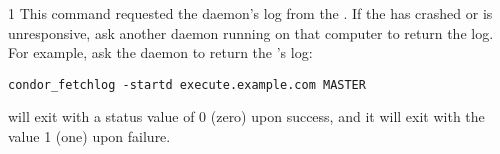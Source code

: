 \begin{ManPage}{\label{man-condor-fetchlog}}{1}
This command requested the  daemon's log from the
.
If the  has crashed or is unresponsive,
ask another daemon
running on that computer to return the log.
For example, ask the  daemon to return the
's log:

\begin{verbatim}
condor_fetchlog -startd execute.example.com MASTER
\end{verbatim}

\ExitStatus
{} will exit with a status value of 0 (zero) upon success,
and it will exit with the value 1 (one) upon failure.

\end{ManPage}
